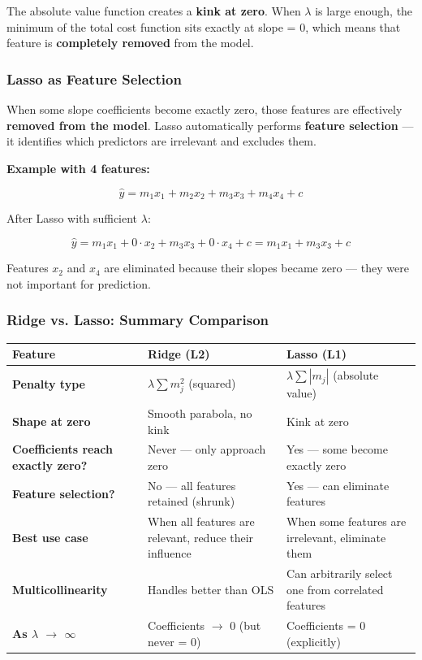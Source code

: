 \documentclass[12pt,openany]{book}
\begin{document}
The absolute value function creates a \textbf{kink at zero}. When \(\lambda\) is large enough, the minimum of the total cost function sits exactly at slope = 0, which means that feature is \textbf{completely removed} from the model.

\subsubsection{Lasso as Feature Selection}


When some slope coefficients become exactly zero, those features are effectively \textbf{removed from the model}. Lasso automatically performs \textbf{feature selection} --- it identifies which predictors are irrelevant and excludes them.

\textbf{Example with 4 features:}

\[
\hat{y} = m_1 x_1 + m_2 x_2 + m_3 x_3 + m_4 x_4 + c
\]


After Lasso with sufficient \(\lambda\):

\[
\hat{y} = m_1 x_1 + 0 \cdot x_2 + m_3 x_3 + 0 \cdot x_4 + c = m_1 x_1 + m_3 x_3 + c
\]


Features \(x_2\) and \(x_4\) are eliminated because their slopes became zero --- they were not important for prediction.

\subsubsection{Ridge vs. Lasso: Summary Comparison}


\begin{center}
\small
\renewcommand{\arraystretch}{1.15}
\begin{tabular}{|L{0.22\textwidth}|L{0.30\textwidth}|L{0.36\textwidth}|}
\hline
    Feature & Ridge (L2) & Lasso (L1) \\
\hline
    \textbf{Penalty type} & \(\lambda \sum m_j^2\) (squared) & \(\lambda \sum |m_j|\) (absolute value) \\
\hline
    \textbf{Shape at zero} & Smooth parabola, no kink & Kink at zero \\
\hline
    \textbf{Coefficients reach exactly zero?} & Never --- only approach zero & Yes --- some become exactly zero \\
\hline
    \textbf{Feature selection?} & No --- all features retained (shrunk) & Yes --- can eliminate features \\
\hline
    \textbf{Best use case} & When all features are relevant, reduce their influence & When some features are irrelevant, eliminate them \\
\hline
    \textbf{Multicollinearity} & Handles better than OLS & Can arbitrarily select one from correlated features \\
\hline
    \textbf{As \(\lambda\) \(\rightarrow\) \(\infty\)} & Coefficients \(\rightarrow\) 0 (but never = 0) & Coefficients = 0 (explicitly) \\
\hline
\end{tabular}
\end{center}
\normalsize
\end{document}
